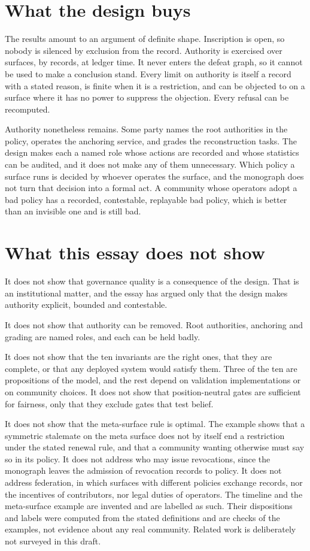 \documentclass[11pt]{article}
\begin{document}
\section{What the design buys}\label{sec:buy}

The results amount to an argument of definite shape. Inscription is open, so nobody is silenced by exclusion from the record. Authority is exercised over surfaces, by records, at ledger time. It never enters the defeat graph, so it cannot be used to make a conclusion stand. Every limit on authority is itself a record with a stated reason, is finite when it is a restriction, and can be objected to on a surface where it has no power to suppress the objection. Every refusal can be recomputed.

Authority nonetheless remains. Some party names the root authorities in the policy, operates the anchoring service, and grades the reconstruction tasks. The design makes each a named role whose actions are recorded and whose statistics can be audited, and it does not make any of them unnecessary. Which policy a surface runs is decided by whoever operates the surface, and the monograph does not turn that decision into a formal act. A community whose operators adopt a bad policy has a recorded, contestable, replayable bad policy, which is better than an invisible one and is still bad.

\section{What this essay does not show}\label{sec:limits}

It does not show that governance quality is a consequence of the design. That is an institutional matter, and the essay has argued only that the design makes authority explicit, bounded and contestable.

It does not show that authority can be removed. Root authorities, anchoring and grading are named roles, and each can be held badly.

It does not show that the ten invariants are the right ones, that they are complete, or that any deployed system would satisfy them. Three of the ten are propositions of the model, and the rest depend on validation implementations or on community choices. It does not show that position-neutral gates are sufficient for fairness, only that they exclude gates that test belief.

It does not show that the meta-surface rule is optimal. The example shows that a symmetric stalemate on the meta surface does not by itself end a restriction under the stated renewal rule, and that a community wanting otherwise must say so in its policy. It does not address who may issue revocations, since the monograph leaves the admission of revocation records to policy. It does not address federation, in which surfaces with different policies exchange records, nor the incentives of contributors, nor legal duties of operators. The timeline and the meta-surface example are invented and are labelled as such. Their dispositions and labels were computed from the stated definitions and are checks of the examples, not evidence about any real community. Related work is deliberately not surveyed in this draft.
\end{document}
